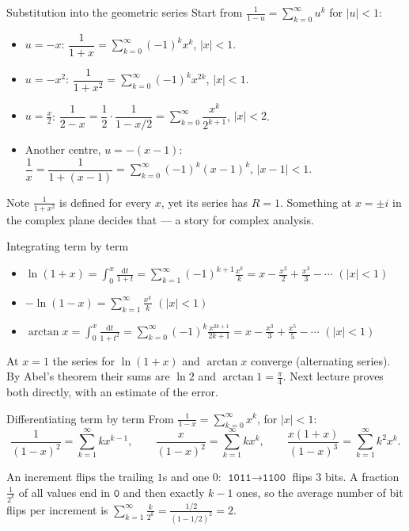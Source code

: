 \documentclass{wosm-slides}
\begin{document}
\begin{frame}{Substitution into the geometric series}
  Start from $\frac{1}{1-u} = \sum_{k=0}^\infty u^k$ for $|u| < 1$:
  \begin{itemize}
    \item $u = -x$: \quad
      $\dfrac{1}{1+x} = \sum_{k=0}^\infty (-1)^k x^k$, \quad $|x| < 1$.
    \item $u = -x^2$: \quad
      $\dfrac{1}{1+x^2} = \sum_{k=0}^\infty (-1)^k x^{2k}$, \quad $|x| < 1$.
    \item $u = \frac{x}{2}$: \quad
      $\dfrac{1}{2-x} = \dfrac12 \cdot \dfrac{1}{1 - x/2} = \sum_{k=0}^\infty \dfrac{x^k}{2^{k+1}}$,
      \quad $|x| < 2$.
    \item Another centre, $u = -(x-1)$: \quad
      $\dfrac1x = \dfrac{1}{1 + (x-1)} = \sum_{k=0}^\infty (-1)^k (x-1)^k$, \quad $|x - 1| < 1$.
  \end{itemize}
  \pause
  {\small Note $\frac{1}{1+x^2}$ is defined for every $x$, yet its series has $R = 1$.
  Something at $x = \pm i$ in the complex plane decides that --- a story for complex analysis.\par}
\end{frame}

\begin{frame}{Integrating term by term}
  \begin{itemize}
    \item $\displaystyle\ln(1 + x) = \int_0^x \frac{\mathrm{d}t}{1+t}
      = \sum_{k=1}^\infty (-1)^{k+1} \frac{x^k}{k} = x - \frac{x^2}{2} + \frac{x^3}{3} - \cdots$
      \quad $(|x| < 1)$
    \item $\displaystyle -\ln(1 - x) = \sum_{k=1}^\infty \frac{x^k}{k}$ \quad $(|x| < 1)$
    \item $\displaystyle\arctan x = \int_0^x \frac{\mathrm{d}t}{1+t^2}
      = \sum_{k=0}^\infty (-1)^k \frac{x^{2k+1}}{2k+1} = x - \frac{x^3}{3} + \frac{x^5}{5} - \cdots$
      \quad $(|x| < 1)$
  \end{itemize}
  \pause
  \begin{remark}
    At $x = 1$ the series for $\ln(1+x)$ and $\arctan x$ converge (alternating series).
    By Abel's theorem their sums are $\ln 2$ and $\arctan 1 = \frac\pi4$. Next lecture
    proves both directly, with an estimate of the error.
  \end{remark}
\end{frame}

\begin{frame}{Differentiating term by term}
  From $\frac{1}{1-x} = \sum_{k=0}^\infty x^k$, for $|x| < 1$:
  \[ \frac{1}{(1-x)^2} = \sum_{k=1}^\infty k x^{k-1}, \qquad
     \frac{x}{(1-x)^2} = \sum_{k=1}^\infty k x^k, \qquad
     \frac{x(1+x)}{(1-x)^3} = \sum_{k=1}^\infty k^2 x^k . \]
  \pause
  \begin{example}
    An increment flips the trailing $1$s and one $0$: $\texttt{1011} \to \texttt{1100}$ flips
    $3$ bits. A fraction $\frac{1}{2^k}$ of all values end in $\texttt{0}$ and then exactly $k - 1$
    ones, so the average number of bit flips per increment is
    $\sum_{k=1}^\infty \frac{k}{2^k} = \frac{1/2}{(1 - 1/2)^2} = 2$.
  \end{example}
\end{frame}
\end{document}
